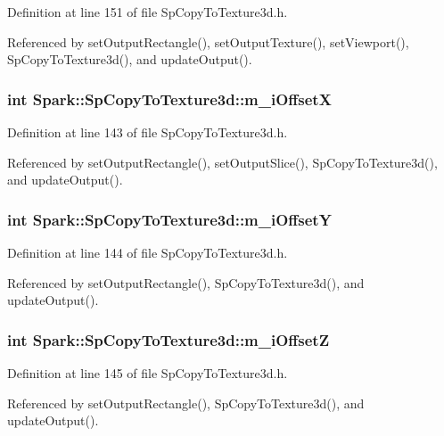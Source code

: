 Definition at line 151 of file Sp\-Copy\-To\-Texture3d.h.

Referenced by set\-Output\-Rectangle(), set\-Output\-Texture(), set\-Viewport(), Sp\-Copy\-To\-Texture3d(), and update\-Output().
\subsubsection{\setlength{\rightskip}{0pt plus 5cm}int {\bf Spark::Sp\-Copy\-To\-Texture3d::m\_\-i\-Offset\-X}\hspace{0.3cm}{\tt  [protected]}}\label{classSpark_1_1SpCopyToTexture3d_p1}


Definition at line 143 of file Sp\-Copy\-To\-Texture3d.h.

Referenced by set\-Output\-Rectangle(), set\-Output\-Slice(), Sp\-Copy\-To\-Texture3d(), and update\-Output().
\subsubsection{\setlength{\rightskip}{0pt plus 5cm}int {\bf Spark::Sp\-Copy\-To\-Texture3d::m\_\-i\-Offset\-Y}\hspace{0.3cm}{\tt  [protected]}}\label{classSpark_1_1SpCopyToTexture3d_p2}


Definition at line 144 of file Sp\-Copy\-To\-Texture3d.h.

Referenced by set\-Output\-Rectangle(), Sp\-Copy\-To\-Texture3d(), and update\-Output().
\subsubsection{\setlength{\rightskip}{0pt plus 5cm}int {\bf Spark::Sp\-Copy\-To\-Texture3d::m\_\-i\-Offset\-Z}\hspace{0.3cm}{\tt  [protected]}}\label{classSpark_1_1SpCopyToTexture3d_p3}


Definition at line 145 of file Sp\-Copy\-To\-Texture3d.h.

Referenced by set\-Output\-Rectangle(), Sp\-Copy\-To\-Texture3d(), and update\-Output().
